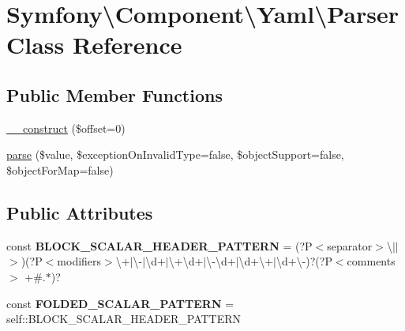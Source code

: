\hypertarget{classSymfony_1_1Component_1_1Yaml_1_1Parser}{}\section{Symfony\textbackslash{}Component\textbackslash{}Yaml\textbackslash{}Parser Class Reference}
\label{classSymfony_1_1Component_1_1Yaml_1_1Parser}
\subsection*{Public Member Functions}
\begin{DoxyCompactItemize}
\item 
\hyperlink{classSymfony_1_1Component_1_1Yaml_1_1Parser_a4203eccb5c67be0044fe2106c1aace17}{\+\_\+\+\_\+construct} (\$offset=0)
\item 
\hyperlink{classSymfony_1_1Component_1_1Yaml_1_1Parser_aec751a33cf083f715c8a5429a0aec62f}{parse} (\$value, \$exception\+On\+Invalid\+Type=false, \$object\+Support=false, \$object\+For\+Map=false)
\end{DoxyCompactItemize}
\subsection*{Public Attributes}
\begin{DoxyCompactItemize}
\item 
const {\bfseries B\+L\+O\+C\+K\+\_\+\+S\+C\+A\+L\+A\+R\+\_\+\+H\+E\+A\+D\+E\+R\+\_\+\+P\+A\+T\+T\+E\+RN} = \textquotesingle{}(?P$<$separator$>$\textbackslash{}$\vert$$\vert$$>$)(?P$<$modifiers$>$\textbackslash{}+$\vert$\textbackslash{}-\/$\vert$\textbackslash{}d+$\vert$\textbackslash{}+\textbackslash{}d+$\vert$\textbackslash{}-\/\textbackslash{}d+$\vert$\textbackslash{}d+\textbackslash{}+$\vert$\textbackslash{}d+\textbackslash{}-\/)?(?P$<$comments$>$ +\#.$\ast$)?\textquotesingle{}\hypertarget{classSymfony_1_1Component_1_1Yaml_1_1Parser_ad83e24f6ae5f3386d6508e976e2020bc}{}\label{classSymfony_1_1Component_1_1Yaml_1_1Parser_ad83e24f6ae5f3386d6508e976e2020bc}

\item 
const {\bfseries F\+O\+L\+D\+E\+D\+\_\+\+S\+C\+A\+L\+A\+R\+\_\+\+P\+A\+T\+T\+E\+RN} = self\+::\+B\+L\+O\+C\+K\+\_\+\+S\+C\+A\+L\+A\+R\+\_\+\+H\+E\+A\+D\+E\+R\+\_\+\+P\+A\+T\+T\+E\+RN\hypertarget{classSymfony_1_1Component_1_1Yaml_1_1Parser_a060fdf41bbc448d258611b643d9a9eef}{}\label{classSymfony_1_1Component_1_1Yaml_1_1Parser_a060fdf41bbc448d258611b643d9a9eef}

\end{DoxyCompactItemize}


